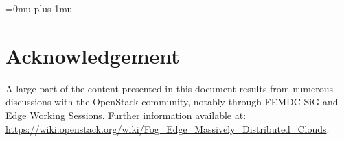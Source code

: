 \documentclass[letterpaper,twocolumn,10pt]{article}
\begin{document}




% 
% 


\Urlmuskip=0mu plus 1mu\relax

{\footnotesize
}
\section*{Acknowledgement}
A large part of the content presented in this document results from numerous discussions
with the OpenStack community, notably through FEMDC SiG and Edge
Working Sessions.  Further information available at:
\url{https://wiki.openstack.org/wiki/Fog_Edge_Massively_Distributed_Clouds}.

\theendnotes
\end{document}
